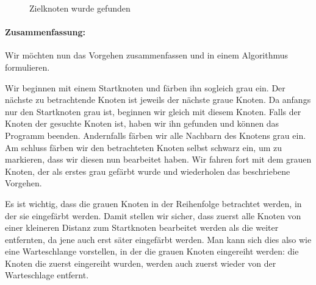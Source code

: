 \begin{figure}[htb]
\begin{center}
\caption{Zielknoten wurde gefunden}
\label{fig:bfs:bfs4}
\end{center}
\end{figure}


\paragraph{Zusammenfassung:}Wir m\"ochten nun das Vorgehen zusammenfassen und in einem Algorithmus formulieren.

Wir beginnen mit einem Startknoten und f\"arben ihn sogleich grau ein. Der n\"achste zu betrachtende Knoten ist jeweils der n\"achste graue Knoten. Da anfangs nur den Startknoten grau ist, beginnen wir gleich mit diesem Knoten. Falls der Knoten der gesuchte Knoten ist, haben wir ihn gefunden und k\"onnen das Programm beenden. Andernfalls f\"arben wir alle Nachbarn des Knotens grau ein. Am schluss f\"arben wir den betrachteten Knoten selbst schwarz ein, um zu markieren, dass wir diesen nun bearbeitet haben. Wir fahren fort mit dem grauen Knoten, der als erstes grau gef\"arbt wurde und wiederholen das beschriebene Vorgehen. 

Es ist wichtig, dass die grauen Knoten in der Reihenfolge betrachtet werden, in der sie eingef\"arbt werden. Damit stellen wir sicher, dass zuerst alle Knoten von einer kleineren Distanz zum Startknoten bearbeitet werden als die weiter entfernten, da jene auch erst s\"ater eingef\"arbt werden. Man kann sich dies also wie eine Warteschlange vorstellen, in der die grauen Knoten eingereiht werden:  die Knoten die zuerst eingereiht wurden, werden auch zuerst wieder von der Warteschlage entfernt.

